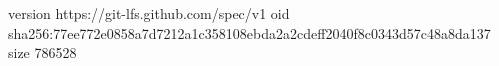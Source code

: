 version https://git-lfs.github.com/spec/v1
oid sha256:77ee772e0858a7d7212a1c358108ebda2a2cdeff2040f8c0343d57c48a8da137
size 786528
